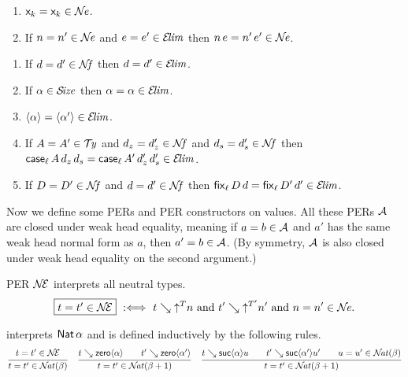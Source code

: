 \documentclass[acmlarge,review,anonymous]{acmart}\settopmatter{printfolios=true}
\begin{document}
\begin{lemma}
  \label{lem:closne}
  \bla
  \begin{enumerate}
  \item $\lev k = \lev k \in \NE$.
  \item If\/ $n = n' \in \NE$ and $e = e' \in \ELIM$ then $n\,e = n'\,e' \in \NE$.
  \end{enumerate}
\end{lemma}

\begin{lemma}
  \label{lem:closelim}
  \bla
  \begin{enumerate}
  \item If\/ $d = d' \in \NF$ then $d = d' \in \ELIM$.
  \item If\/ $\alpha \in \SIZE$ then $\alpha = \alpha \in \ELIM$.
  \item $\ann \alpha = \ann{\alpha'} \in \ELIM$.
  \item If\/ $A = A' \in \TY$ and $d_z = d_z' \in \NF$ and $d_s = d_s' \in \NF$
        then $\case[\ell] A {d_z}{d_s} = \case[\ell]{A'}{d_z'}{d_s'} \in \ELIM$.
  \item If\/ $D = D' \in \NF$ and $d = d' \in \NF$ then $\fix[\ell] D d = \fix[\ell]{D'}{d'} \in \ELIM$.
  \end{enumerate}
\end{lemma}

Now we define some PERs and PER constructors on values.  All these PERs $\A$ are closed under weak head equality, meaning if $a = b \in \A$ and $a'$ has the same weak head normal form as $a$, then $a' = b \in \A$.  (By symmetry, $\A$ is also closed under weak head equality on the second argument.)

PER $\NEE$ interprets all neutral types.
\[
\fbox{$t = t' \in \NEE$} \defas
  t \evalsto \up T n \mand t' \evalsto \up{T'}{n'} \mand
  n = n' \in \NE
  .
\]

\fbox{$\NAT(\alpha)$} interprets $\Nat \alpha$ and is defined inductively by the following rules.
\begin{gather*}
  \ru{%
      t = t' \in \NEE
    }{t = t' \in \NAT(\beta)}
\quad
  \ru{t \evalsto \zero \alpha \qquad
      t' \evalsto \zero{\alpha'}
    }{t = t' \in \NAT(\beta+1)}
\quad
  \ru{t \evalsto \suc \alpha u \qquad
      t' \evalsto \suc {\alpha'} {u'} \qquad
      u = u' \in \NAT(\beta)
    }{t = t' \in \NAT(\beta+1)}
\end{gather*}
\end{document}
